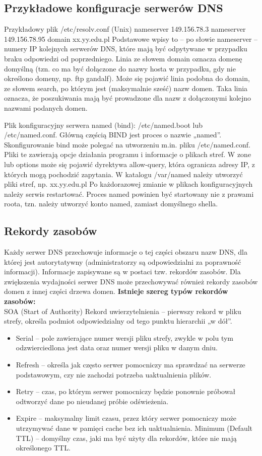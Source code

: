 \documentclass[a4paper]{article}
\begin{document}
\subsection{Przykładowe konfiguracje serwerów DNS}
Przykładowy plik /etc/resolv.conf (Unix)
nameserver 149.156.78.3
nameserver 149.156.78.95
domain xx.yy.edu.pl
Podstawowe wpisy to – po słowie nameserver – numery IP kolejnych serwerów DNS, które
mają być odpytywane w przypadku braku odpowiedzi od poprzedniego.
Linia ze słowem domain oznacza domenę domyślną (tzn. co ma być dołączone do nazwy
hosta w przypadku, gdy nie określono domeny, np. ftp gandalf).
Może się pojawić linia podobna do domain, ze słowem search, po którym jest (maksymalnie
sześć) nazw domen. Taka linia oznacza, że poszukiwania mają być prowadzone dla nazw z
dołączonymi kolejno nazwami podanych domen.


Plik konfiguracyjny serwera named (bind): /etc/named.boot lub /etc/named.conf.
Główną częścią BIND jest proces o nazwie „named”.
Skonfigurowanie bind może polegać na utworzeniu m.in. pliku /etc/named.conf. Pliki te zawierają opcje działania programu i informacje o plikach
stref. 
W zone lub options może się pojawić dyrektywa allow-query,
która ogranicza adresy IP, z których mogą pochodzić zapytania.
W katalogu /var/named należy utworzyć pliki stref, np. xx.yy.edu.pl
Po każdorazowej zmianie w plikach konfiguracyjnych należy serwis restartować.
Proces named powinien być startowany nie z prawami roota, tzn. należy utworzyć konto
named, zamiast domyślnego shella.

\subsection{Rekordy zasobów}
Każdy serwer DNS przechowuje informacje o tej części obszaru nazw DNS, dla której jest
autorytatywny (administratorzy są odpowiedzialni za poprawność informacji). Informacje
zapisywane są w postaci tzw. rekordów zasobów.
Dla zwiększenia wydajności serwer DNS może przechowywać również rekordy zasobów
domen z innej części drzewa domen.
\textbf{Istnieje szereg typów rekordów zasobów:}\\
SOA (Start of Authority) Rekord uwierzytelnienia – pierwszy rekord w pliku
strefy, określa podmiot odpowiedzialny od tego punktu hierarchii „w dół”.
    \begin{itemize}
        \item Serial – pole zawierające numer wersji pliku strefy, zwykle w polu tym odzwierciedlona jest
data oraz numer wersji pliku w danym dniu.
        \item Refresh – określa jak często serwer pomocniczy ma sprawdzać na serwerze podstawowym,
czy nie zachodzi potrzeba uaktualnienia plików.
        \item Retry – czas, po którym serwer pomocniczy będzie ponownie próbował odtworzyć dane po
nieudanej próbie odświeżenia.
        \item Expire – maksymalny limit czasu, przez który serwer pomocniczy może utrzymywać dane w
pamięci cache bez ich uaktualnienia.
Minimum (Default TTL) – domyślny czas, jaki ma być użyty dla rekordów, które nie mają
określonego TTL.
    \end{itemize}
\end{document}
